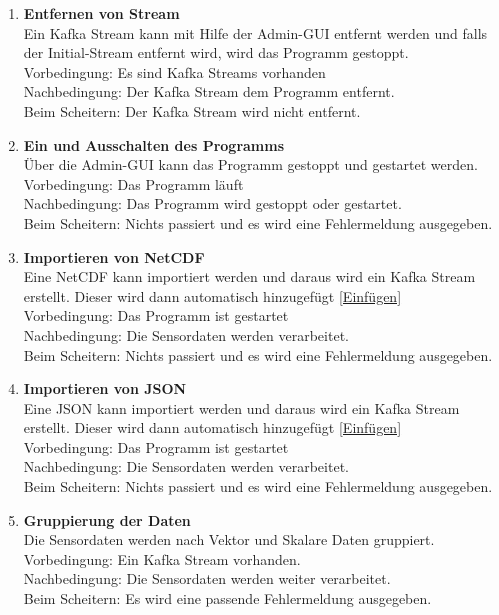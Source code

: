 \begin{enumerate}[label=\textbf{PF\arabic{enumi}0}]
	\item \textbf{Entfernen von Stream}\\
		Ein Kafka Stream kann mit Hilfe der Admin-GUI entfernt werden und falls der Initial-Stream entfernt wird, wird das Programm gestoppt.\\ 
		Vorbedingung: Es sind Kafka Streams vorhanden\\ 
		Nachbedingung: Der Kafka Stream dem Programm entfernt.\\ 
		Beim Scheitern: Der Kafka Stream wird nicht entfernt.
		
	\item \textbf{Ein und Ausschalten des Programms}\\
		Über die Admin-GUI kann das Programm gestoppt und gestartet werden.\\
		Vorbedingung: Das Programm läuft\\  
		Nachbedingung: Das Programm wird gestoppt oder gestartet.\\ 
		Beim Scheitern: Nichts passiert und es wird eine Fehlermeldung ausgegeben.
		
	\item \textbf{Importieren von NetCDF}\\
		Eine NetCDF kann importiert werden und daraus wird ein Kafka Stream erstellt. Dieser wird dann automatisch hinzugefügt \ref{Einfügen}\\ 
		Vorbedingung: Das Programm ist gestartet\\ 
		Nachbedingung: Die Sensordaten werden verarbeitet. \\ 
		Beim Scheitern: Nichts passiert und es wird eine Fehlermeldung ausgegeben. 
		
	\item \textbf{Importieren von JSON}\\
		Eine JSON kann importiert werden und daraus wird ein Kafka Stream erstellt. Dieser wird dann automatisch hinzugefügt \ref{Einfügen}\\ 
		Vorbedingung: Das Programm ist gestartet\\ 
		Nachbedingung: Die Sensordaten werden verarbeitet. \\ 
		Beim Scheitern: Nichts passiert und es wird eine Fehlermeldung ausgegeben. 	
		
	\item \textbf{Gruppierung der Daten } \label{Group}\\ 
		Die Sensordaten werden nach Vektor und Skalare Daten gruppiert.\\ 
		Vorbedingung: Ein Kafka Stream vorhanden.\\ 
		Nachbedingung: Die Sensordaten werden weiter verarbeitet. \\ 
		Beim Scheitern: Es wird eine passende Fehlermeldung ausgegeben.	
		

\end{enumerate}
